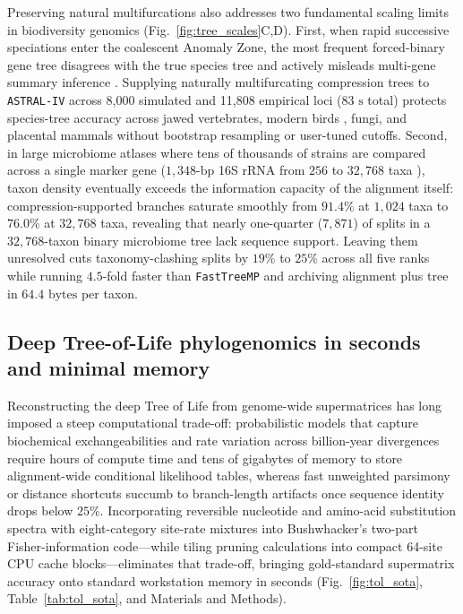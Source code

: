 \documentclass[11pt,a4paper]{article}
\begin{document}
Preserving natural multifurcations also addresses two fundamental scaling limits in biodiversity genomics (Fig.~\ref{fig:tree_scales}C,D). First, when rapid successive speciations enter the coalescent Anomaly Zone, the most frequent forced-binary gene tree disagrees with the true species tree and actively misleads multi-gene summary inference \citep{degnan2006discordance}. Supplying naturally multifurcating compression trees to \texttt{ASTRAL-IV} \citep{zhang2025aster} across 8,000 simulated and 11,808 empirical loci ($83\text{ s}$ total) protects species-tree accuracy across jawed vertebrates, modern birds \citep{prum2015comprehensive,shultz2019widespread}, fungi, and placental mammals without bootstrap resampling or user-tuned cutoffs. Second, in large microbiome atlases where tens of thousands of strains are compared across a single marker gene ($1,348\text{-bp}$ 16S rRNA from $256$ to $32,768$ taxa \citep{mcdonald2012greengenes}), taxon density eventually exceeds the information capacity of the alignment itself: compression-supported branches saturate smoothly from $91.4\%$ at $1,024$ taxa to $76.0\%$ at $32,768$ taxa, revealing that nearly one-quarter ($7,871$) of splits in a $32,768$-taxon binary microbiome tree lack sequence support. Leaving them unresolved cuts taxonomy-clashing splits by $19\%$ to $25\%$ across all five ranks while running $4.5$-fold faster than \texttt{FastTreeMP} and archiving alignment plus tree in $64.4\text{ bytes}$ per taxon.

\subsection*{Deep Tree-of-Life phylogenomics in seconds and minimal memory}

Reconstructing the deep Tree of Life from genome-wide supermatrices has long imposed a steep computational trade-off: probabilistic models that capture biochemical exchangeabilities and rate variation across billion-year divergences require hours of compute time and tens of gigabytes of memory to store alignment-wide conditional likelihood tables, whereas fast unweighted parsimony or distance shortcuts succumb to branch-length artifacts once sequence identity drops below $25\%$. Incorporating reversible nucleotide and amino-acid substitution spectra with eight-category site-rate mixtures into Bushwhacker's two-part Fisher-information code---while tiling pruning calculations into compact 64-site CPU cache blocks---eliminates that trade-off, bringing gold-standard supermatrix accuracy onto standard workstation memory in seconds (Fig.~\ref{fig:tol_sota}, Table~\ref{tab:tol_sota}, and Materials and Methods).
\end{document}
